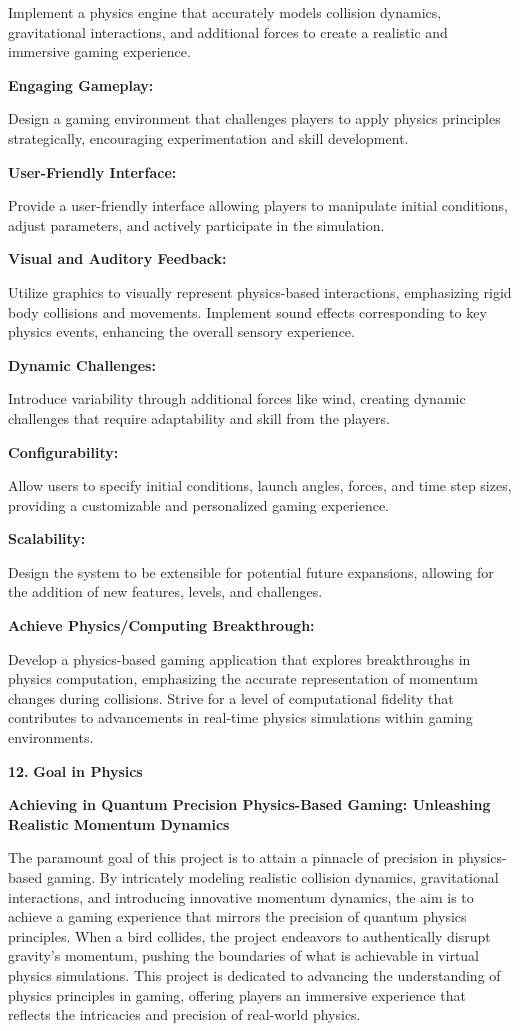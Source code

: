 \documentclass[
]{article}
\begin{document}
Implement a physics engine that accurately models collision dynamics,
gravitational interactions, and additional forces to create a realistic
and immersive gaming experience.

\textbf{Engaging Gameplay:}

Design a gaming environment that challenges players to apply physics
principles strategically, encouraging experimentation and skill
development.

\textbf{User-Friendly Interface:}

Provide a user-friendly interface allowing players to manipulate initial
conditions, adjust parameters, and actively participate in the
simulation.

\textbf{Visual and Auditory Feedback:}

Utilize graphics to visually represent physics-based interactions,
emphasizing rigid body collisions and movements. Implement sound effects
corresponding to key physics events, enhancing the overall sensory
experience.

\textbf{Dynamic Challenges:}

Introduce variability through additional forces like wind, creating
dynamic challenges that require adaptability and skill from the players.

\textbf{Configurability:}

Allow users to specify initial conditions, launch angles, forces, and
time step sizes, providing a customizable and personalized gaming
experience.

\textbf{Scalability:}

Design the system to be extensible for potential future expansions,
allowing for the addition of new features, levels, and challenges.

\textbf{Achieve Physics/Computing Breakthrough:}

Develop a physics-based gaming application that explores breakthroughs
in physics computation, emphasizing the accurate representation of
momentum changes during collisions. Strive for a level of computational
fidelity that contributes to advancements in real-time physics
simulations within gaming environments.

\textbf{12.} \textbf{Goal in Physics}

\textbf{Achieving in Quantum Precision Physics-Based Gaming: Unleashing
Realistic Momentum Dynamics}

The paramount goal of this project is to attain a pinnacle of precision
in physics-based gaming. By intricately modeling realistic collision
dynamics, gravitational interactions, and introducing innovative
momentum dynamics, the aim is to achieve a gaming experience that
mirrors the precision of quantum physics principles. When a bird
collides, the project endeavors to authentically disrupt gravity's
momentum, pushing the boundaries of what is achievable in virtual
physics simulations. This project is dedicated to advancing the
understanding of physics principles in gaming, offering players an
immersive experience that reflects the intricacies and precision of
real-world physics.
\end{document}
